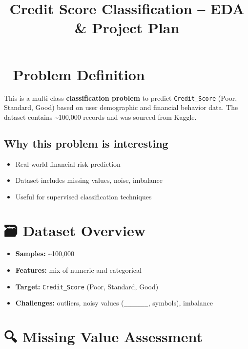 \documentclass[
  10pt,
]{article}
\title{Credit Score Classification -- EDA \& Project Plan}
\author{}
\date{}
\providecommand{\tightlist}{%
  \setlength{\itemsep}{0pt}\setlength{\parskip}{0pt}}\usepackage{longtable,booktabs,array}
\begin{document}
\maketitle


\section{🧩 Problem Definition}\label{problem-definition}

This is a multi-class \textbf{classification problem} to predict
\texttt{Credit\_Score} (Poor, Standard, Good) based on user demographic
and financial behavior data. The dataset contains \textasciitilde100,000
records and was sourced from Kaggle.

\subsection{Why this problem is
interesting}\label{why-this-problem-is-interesting}

\begin{itemize}
\tightlist
\item
  Real-world financial risk prediction\\
\item
  Dataset includes missing values, noise, imbalance\\
\item
  Useful for supervised classification techniques
\end{itemize}

\section{🗃️ Dataset Overview}\label{dataset-overview}

\begin{itemize}
\tightlist
\item
  \textbf{Samples:} \textasciitilde100,000\\
\item
  \textbf{Features:} mix of numeric and categorical\\
\item
  \textbf{Target:} \texttt{Credit\_Score} (Poor, Standard, Good)\\
\item
  \textbf{Challenges:} outliers, noisy values (\texttt{\_\_\_\_\_\_\_},
  symbols), imbalance
\end{itemize}

\section{🔍 Missing Value Assessment}\label{missing-value-assessment}
\end{document}
